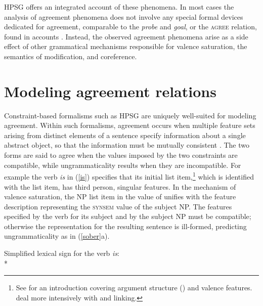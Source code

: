 \documentclass[output=paper
 	        ,biblatex
                ,babelshorthands
                ,newtxmath
                ,draftmode
                ,colorlinks, citecolor=brown
]{langscibook}
\begin{document}
HPSG offers an integrated account of these phenomena. In most cases the analysis of agreement phenomena does not involve any  special formal devices dedicated for agreement, comparable to the \textit{probe} and \textit{goal}, or the \textsc{agree} relation, found in  accounts \citep{Chomsky2000b-u}.  Instead, the observed agreement phenomena arise as a side effect of other grammatical mechanisms responsible for valence saturation, the semantics of modification, and coreference.  

\section{Modeling agreement relations} 
\label{unif-sec}\label{agreement:sec-unification}


Constraint-based formalisms such as HPSG are uniquely well-suited for modeling agreement.  
Within such formalisms, agreement occurs when 
multiple feature sets
 arising from distinct elements of a sentence specify information about a single abstract object, so that the information must be mutually consistent \citep{Kay:1984}.  
The two forms are said to agree when the values imposed by the two constraints are compatible, while ungrammaticality results when they are incompatible.  For example the  verb \textit{is} in (\ref{is}) specifies that its initial \argst list item,\footnote{
See  for an introduction covering argument structure (\argst) and valence features.  deal more intensively with \argst and linking.} which is identified with the \subj list item, has third person, singular features.  In the mechanism of valence saturation, the NP list item in the value of \subj unifies with the feature description representing the \textsc{synsem} value of the subject NP.  The features specified by the verb for its subject and by the subject NP must be compatible; otherwise the representation for the resulting sentence is ill-formed, predicting ungrammaticality as in (\ref{sober}a).  

\ea		
\label{is} 
Simplified lexical sign for the verb \textit{is}:\\*
\z
\end{document}
